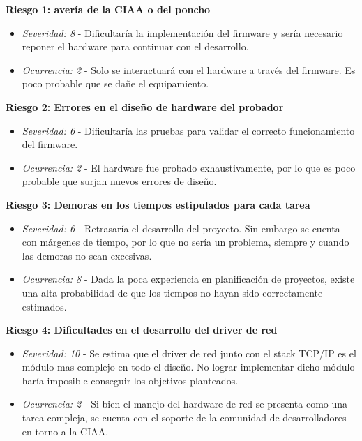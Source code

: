 \documentclass[11pt]{charter}
\begin{document}
\begin{tcolorbox}
\textbf{Riesgo 1: avería de la CIAA o del poncho}
\begin{itemize}
	\item \textit{Severidad: 8} - Dificultaría la implementación del firmware y sería necesario reponer el hardware para continuar con el desarrollo.
	\item \textit{Ocurrencia: 2} - Solo se interactuará con el hardware a través del firmware. Es poco probable que se dañe el equipamiento.
\end{itemize}
\end{tcolorbox}

\begin{tcolorbox}
\textbf{Riesgo 2: Errores en el diseño de hardware del probador}
\begin{itemize}
	\item \textit{Severidad: 6} - Dificultaría las pruebas para validar el correcto funcionamiento del firmware. 
	\item \textit{Ocurrencia: 2} - El hardware fue probado exhaustivamente, por lo que es poco probable que surjan nuevos errores de diseño.
\end{itemize}
\end{tcolorbox}

\begin{tcolorbox}
\textbf{Riesgo 3: Demoras en los tiempos estipulados para cada tarea}
\begin{itemize}
	\item \textit{Severidad: 6} - Retrasaría el desarrollo del proyecto. Sin embargo se cuenta con márgenes de tiempo, por lo que no sería un problema, siempre y cuando las demoras no sean excesivas.
	\item \textit{Ocurrencia: 8} - Dada la poca experiencia en planificación de proyectos, existe una alta probabilidad de que los tiempos no hayan sido correctamente estimados.
\end{itemize}
\end{tcolorbox}

\begin{tcolorbox}
\textbf{Riesgo 4: Dificultades en el desarrollo del driver de red}
\begin{itemize}
	\item \textit{Severidad: 10} - Se estima que el driver de red junto con el stack TCP/IP es el módulo mas complejo en todo el diseño. No lograr implementar dicho módulo haría imposible conseguir los objetivos planteados.
	\item \textit{Ocurrencia: 2} - Si bien el manejo del hardware de red se presenta como una tarea compleja, se cuenta con el soporte de la comunidad de desarrolladores en torno a la CIAA.
\end{itemize}
\end{tcolorbox}
\end{document}
